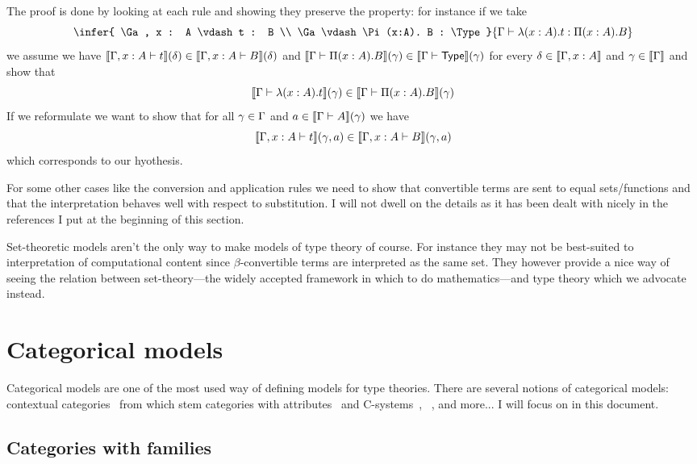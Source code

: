 The proof is done by looking at each rule and showing they preserve the
property: for instance if we take
\[
  \infer
    {
      \Ga, x : A \vdash t : B \\
      \Ga \vdash \Pi (x:A). B : \Type
    }
    {\Ga \vdash \lambda (x:A). t : \Pi (x:A). B}
\]
we assume we have
\(\llbracket \Gamma, x:A \vdash t \rrbracket(\delta) \in \llbracket \Gamma, x:A \vdash B \rrbracket(\delta)\)
and
\(\llbracket \Gamma \vdash \Pi (x:A). B \rrbracket(\gamma) \in \llbracket \Gamma \vdash \mathsf{Type} \rrbracket(\gamma)\)
for every \(\delta \in \llbracket \Gamma, x:A \rrbracket\) and \(\gamma \in \llbracket \Gamma \rrbracket\)
and show that
\[
  \llbracket \Gamma \vdash \lambda (x:A). t \rrbracket(\gamma) \in
  \llbracket \Gamma \vdash \Pi (x:A). B \rrbracket(\gamma)
\]
If we reformulate we want to show that for all \(\gamma \in \Gamma\) and
\(a \in \llbracket \Gamma \vdash A \rrbracket(\gamma)\) we have
\[
  \llbracket \Gamma, x : A \vdash t \rrbracket(\gamma, a) \in
  \llbracket \Gamma, x:A \vdash B \rrbracket(\gamma,a)
\]
which corresponds to our hyothesis.

For some other cases like the conversion and application rules we need to show
that convertible terms are sent to equal sets/functions and that the
interpretation behaves well with respect to substitution.
I will not dwell on the details as it has been dealt with nicely in the
references I put at the beginning of this section.

Set-theoretic models aren't the only way to make models of type theory of
course. For instance they may not be best-suited to interpretation of
computational content since \(\beta\)-convertible terms are interpreted as the
same set. They however provide a nice way of seeing the relation between
set-theory---the widely accepted framework in which to do mathematics---and type
theory which we advocate
instead.

\section{Categorical models}

Categorical models are one of the most used way of defining models for type
theories. There are several notions of categorical models:
contextual categories~ from which stem
categories with attributes~ and
C-systems~,
~, and more...
I will focus on  in this document.

\subsection{Categories with families}


